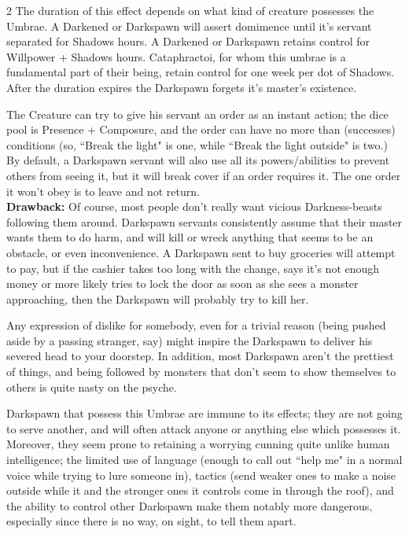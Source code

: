 \begin{multicols}{2}
The duration of this effect depends on what kind of creature possesses the Umbrae. A Darkened or Darkspawn will assert domimence until it's servant separated for Shadows hours. A Darkened or Darkspawn retains control for Willpower + Shadows hours. Cataphractoi, for whom this umbrae is a fundamental part of their being, retain control for one week per dot of Shadows. After the duration expires the Darkspawn forgets it's master's existence.

The Creature can try to give his servant an order as an instant action; the dice pool is Presence + Composure, and the order can have no more than (successes) conditions (so, \textquotedblleft Break the light" is one, while \textquotedblleft Break the light outside" is two.) By default, a Darkspawn servant will also use all its powers/abilities to prevent others from seeing it, but it will break cover if an order requires it. The one order it won't obey is to leave and not return. \\

\noindent \textbf{Drawback:} Of course, most people don't really want vicious Darkness-beasts following them around. Darkspawn servants consistently assume that their master wants them to do harm, and will kill or wreck anything that seems to be an obstacle, or even inconvenience. A Darkspawn sent to buy groceries will attempt to pay, but if the cashier takes too long with the change, says it's not enough money or more likely tries to lock the door as soon as she sees a monster approaching, then the Darkspawn will probably try to kill her. 

Any expression of dislike for somebody, even for a trivial reason (being pushed aside by a passing stranger, say) might inspire the Darkspawn to deliver his severed head to your doorstep. In addition, most Darkspawn aren't the prettiest of things, and being followed by monsters that don't seem to show themselves to others is quite nasty on the psyche.

Darkspawn that possess this Umbrae are immune to its effects; they are not going to serve another, and will often attack anyone or anything else which possesses it. Moreover, they seem prone to retaining a worrying cunning quite unlike human intelligence; the limited use of language (enough to call out \textquotedblleft help me" in a normal voice while trying to lure someone in), tactics (send weaker ones to make a noise outside while it and the stronger ones it controls come in through the roof), and the ability to control other Darkspawn make them notably more dangerous, especially since there is no way, on sight, to tell them apart. 


\end{multicols}

